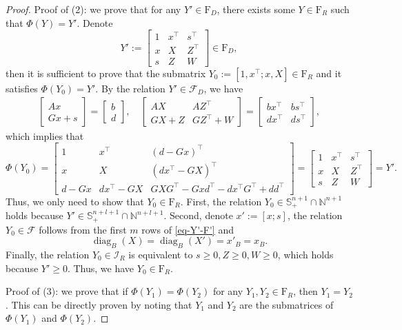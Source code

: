 \documentclass[11pt]{article}
\theoremstyle{plain}
\def\F{\mathcal{F}}
\def\I{\mathcal{I}}
\def\S{\mathbb{S}}
\begin{document}
\begin{proof}
\noindent Proof of (2): we prove that for any $Y'\in{\mathrm{F}_D}$, there exists some $Y\in{\mathrm{F}_R}$ such that $\Phi(Y)=Y'$. Denote
\[
Y':=\begin{bmatrix}
1&x^\top&s^\top\\
x&X&Z^\top\\
s&Z&W
\end{bmatrix}\in {\mathrm{F}_D},
\] 
then it is sufficient to prove that the submatrix $Y_0:=[1, x^\top; x, X] \in{\mathrm{F}_R}$ and it satisfies $\Phi(Y_0)=Y'$. By the relation $Y'\in\F_D$, we have 
\begin{equation}\label{eq-Y'-F'}
\begin{aligned}
\begin{bmatrix}
Ax\\
Gx+s
\end{bmatrix}
=\begin{bmatrix}
b\\
d
\end{bmatrix}
,\quad \begin{bmatrix}
AX&AZ^\top\\
GX+Z&GZ^\top+W
\end{bmatrix}
=\begin{bmatrix}
bx^\top&bs^\top\\
dx^\top&ds^\top
\end{bmatrix},
\end{aligned}
\end{equation}
which implies that
\[
\Phi(Y_0)=\begin{bmatrix}
             1&x^\top&(d-Gx)^\top\\
             x&X&(dx^\top-GX)^\top\\
             d-Gx&dx^\top-GX&GXG^\top -Gxd^\top -dx^\top G^\top +dd^\top
         \end{bmatrix}
=\begin{bmatrix}
1&x^\top&s^\top\\
x&X&Z^\top\\
s&Z&W
\end{bmatrix}=Y'.
\]
Thus, we only need to show that $Y_0\in{\mathrm{F}_R}$.
First, the relation $Y_0\in\S^{n+1}_+\cap\mathbb{N}^{n+1}$ holds because $Y'\in\S^{n+l+1}_+\cap\mathbb{N}^{n+l+1}$. Second, denote $x':=[x;s]$, the relation $Y_0\in\F$ follows from the first $m$ rows of \eqref{eq-Y'-F'} and 
\[
\operatorname{diag}_B(X)=\operatorname{diag}_B(X')=x'_B=x_B.
\]
Finally, the relation $Y_0\in\I_R$ is equivalent to $s\geq0, Z\geq 0, W\geq 0$, which holds because $Y'\geq 0$. Thus, we have $Y_0\in{\mathrm{F}_R}$.
\smallskip

\noindent Proof of (3): we prove that if $\Phi(Y_1)=\Phi(Y_2)$ for any $Y_1,Y_2\in{\mathrm{F}_R}$, then $Y_1=Y_2$.
This can be directly proven by noting that $Y_1$ and $Y_2$ are the submatrices of $\Phi(Y_1)$ and $\Phi(Y_2)$.
\end{proof}
\end{document}
